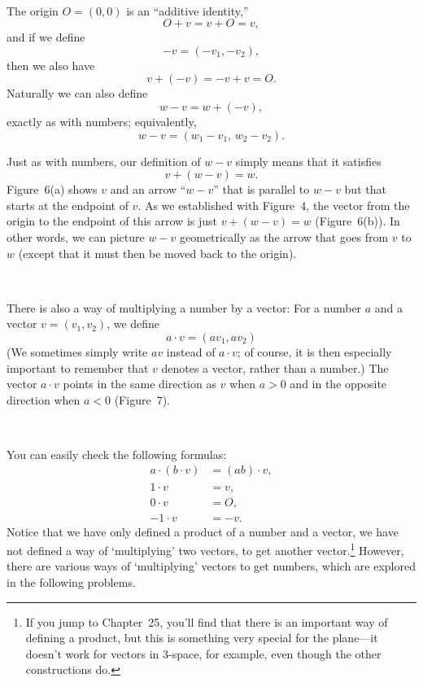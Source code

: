 \begin{center}
\\[0.6em]
\end{center}

The origin $O=(0,0)$ is an ``additive identity,''
\[
O+v=v+O=v,
\]
and if we define
\[
-v=(-v_1,-v_2),
\]
then we also have
\[
v+(-v)=-v+v=O.
\]
Naturally we can also define
\[
w-v=w+(-v),
\]
exactly as with numbers; equivalently,
\[
w-v=(w_1-v_1,\,w_2-v_2).
\]

Just as with numbers, our definition of $w-v$ simply means that it satisfies
\[
v+(w-v)=w.
\]
Figure~6(a) shows $v$ and an arrow ``$w-v$'' that is parallel to $w-v$ but that
starts at the endpoint of $v$. As we established with Figure~4, the vector from
the origin to the endpoint of this arrow is just $v+(w-v)=w$ (Figure~6(b)). In
other words, we can picture $w-v$ geometrically as the arrow that goes from $v$
to $w$ (except that it must then be moved back to the origin).

\begin{center}
\\[0.6em]
\end{center}

There is also a way of multiplying a number by a vector: For a number $a$ and a
vector $v=(v_1,v_2)$, we define
\[
a\cdot v=(av_1,av_2)
\]
(We sometimes simply write $av$ instead of $a\cdot v$; of course, it is then
especially important to remember that $v$ denotes a vector, rather than a
number.) The vector $a\cdot v$ points in the same direction as $v$ when $a>0$
and in the opposite direction when $a<0$ (Figure~7).

\begin{center}
\\[0.6em]
\end{center}

You can easily check the following formulas:
\begin{align*}
a\cdot(b\cdot v)&=(ab)\cdot v,\\
1\cdot v&=v,\\
0\cdot v&=O,\\
-1\cdot v&=-v.
\end{align*}
Notice that we have only defined a product of a number and a vector, we have
not defined a way of `multiplying' two vectors, to get another
vector.\footnote{If you jump to Chapter~25, you'll find that there is an
important way of defining a product, but this is something very special for the
plane---it doesn't work for vectors in 3-space, for example, even though the
other constructions do.} However, there are various ways of `multiplying'
vectors to get numbers, which are explored in the following problems.

